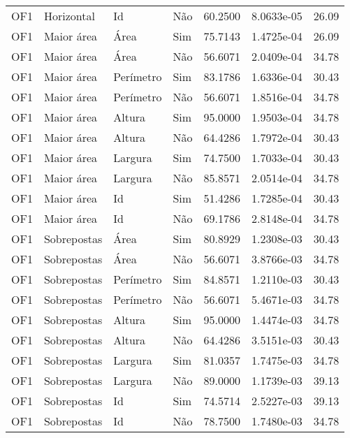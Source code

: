 \begin{tabular}{llllrrr}
OF1       & Horizontal  & Id        & Não         & 60.2500      & 8.0633e-05 & 26.09    \\
OF1       & Maior área  & Área      & Sim         & 75.7143      & 1.4725e-04 & 26.09    \\
OF1       & Maior área  & Área      & Não         & 56.6071      & 2.0409e-04 & 34.78    \\
OF1       & Maior área  & Perímetro & Sim         & 83.1786      & 1.6336e-04 & 30.43    \\
OF1       & Maior área  & Perímetro & Não         & 56.6071      & 1.8516e-04 & 34.78    \\
OF1       & Maior área  & Altura    & Sim         & 95.0000      & 1.9503e-04 & 34.78    \\
OF1       & Maior área  & Altura    & Não         & 64.4286      & 1.7972e-04 & 30.43    \\
OF1       & Maior área  & Largura   & Sim         & 74.7500      & 1.7033e-04 & 30.43    \\
OF1       & Maior área  & Largura   & Não         & 85.8571      & 2.0514e-04 & 34.78    \\
OF1       & Maior área  & Id        & Sim         & 51.4286      & 1.7285e-04 & 30.43    \\
OF1       & Maior área  & Id        & Não         & 69.1786      & 2.8148e-04 & 34.78    \\
OF1       & Sobrepostas & Área      & Sim         & 80.8929      & 1.2308e-03 & 30.43    \\
OF1       & Sobrepostas & Área      & Não         & 56.6071      & 3.8766e-03 & 34.78    \\
OF1       & Sobrepostas & Perímetro & Sim         & 84.8571      & 1.2110e-03 & 30.43    \\
OF1       & Sobrepostas & Perímetro & Não         & 56.6071      & 5.4671e-03 & 34.78    \\
OF1       & Sobrepostas & Altura    & Sim         & 95.0000      & 1.4474e-03 & 34.78    \\
OF1       & Sobrepostas & Altura    & Não         & 64.4286      & 3.5151e-03 & 30.43    \\
OF1       & Sobrepostas & Largura   & Sim         & 81.0357      & 1.7475e-03 & 34.78    \\
OF1       & Sobrepostas & Largura   & Não         & 89.0000      & 1.1739e-03 & 39.13    \\
OF1       & Sobrepostas & Id        & Sim         & 74.5714      & 2.5227e-03 & 39.13    \\
OF1       & Sobrepostas & Id        & Não         & 78.7500      & 1.7480e-03 & 34.78    \\
\hline
\end{tabular}